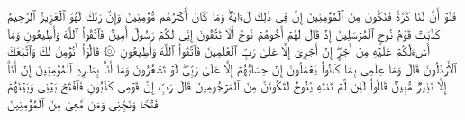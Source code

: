 \stopbuffer%
\startbuffer[\q:26:102]
فَلَوۡ أَنَّ لَنَا كَرَّةࣰ فَنَكُونَ مِنَ ٱلۡمُؤۡمِنِینَ%
\stopbuffer%
\startbuffer[\q:26:103]
إِنَّ فِی ذَٰلِكَ لَءَایَةࣰۖ وَمَا كَانَ أَكۡثَرُهُم مُّؤۡمِنِینَ%
\stopbuffer%
\startbuffer[\q:26:104]
وَإِنَّ رَبَّكَ لَهُوَ ٱلۡعَزِیزُ ٱلرَّحِیمُ%
\stopbuffer%
\startbuffer[\q:26:105]
كَذَّبَتۡ قَوۡمُ نُوحٍ ٱلۡمُرۡسَلِینَ%
\stopbuffer%
\startbuffer[\q:26:106]
إِذۡ قَالَ لَهُمۡ أَخُوهُمۡ نُوحٌ أَلَا تَتَّقُونَ%
\stopbuffer%
\startbuffer[\q:26:107]
إِنِّی لَكُمۡ رَسُولٌ أَمِینࣱ%
\stopbuffer%
\startbuffer[\q:26:108]
فَٱتَّقُوا۟ ٱللَّهَ وَأَطِیعُونِ%
\stopbuffer%
\startbuffer[\q:26:109]
وَمَاۤ أَسۡءَلُكُمۡ عَلَیۡهِ مِنۡ أَجۡرٍۖ إِنۡ أَجۡرِیَ إِلَّا عَلَىٰ رَبِّ ٱلۡعَٰلَمِینَ%
\stopbuffer%
\startbuffer[\q:26:110]
فَٱتَّقُوا۟ ٱللَّهَ وَأَطِیعُونِ%
\stopbuffer%
\startbuffer[\q:26:111]
۞ قَالُوۤا۟ أَنُؤۡمِنُ لَكَ وَٱتَّبَعَكَ ٱلۡأَرۡذَلُونَ%
\stopbuffer%
\startbuffer[\q:26:112]
قَالَ وَمَا عِلۡمِی بِمَا كَانُوا۟ یَعۡمَلُونَ%
\stopbuffer%
\startbuffer[\q:26:113]
إِنۡ حِسَابُهُمۡ إِلَّا عَلَىٰ رَبِّیۖ لَوۡ تَشۡعُرُونَ%
\stopbuffer%
\startbuffer[\q:26:114]
وَمَاۤ أَنَا۠ بِطَارِدِ ٱلۡمُؤۡمِنِینَ%
\stopbuffer%
\startbuffer[\q:26:115]
إِنۡ أَنَا۠ إِلَّا نَذِیرࣱ مُّبِینࣱ%
\stopbuffer%
\startbuffer[\q:26:116]
قَالُوا۟ لَئِن لَّمۡ تَنتَهِ یَٰنُوحُ لَتَكُونَنَّ مِنَ ٱلۡمَرۡجُومِینَ%
\stopbuffer%
\startbuffer[\q:26:117]
قَالَ رَبِّ إِنَّ قَوۡمِی كَذَّبُونِ%
\stopbuffer%
\startbuffer[\q:26:118]
فَٱفۡتَحۡ بَیۡنِی وَبَیۡنَهُمۡ فَتۡحࣰا وَنَجِّنِی وَمَن مَّعِیَ مِنَ ٱلۡمُؤۡمِنِینَ%
\stopbuffer%
